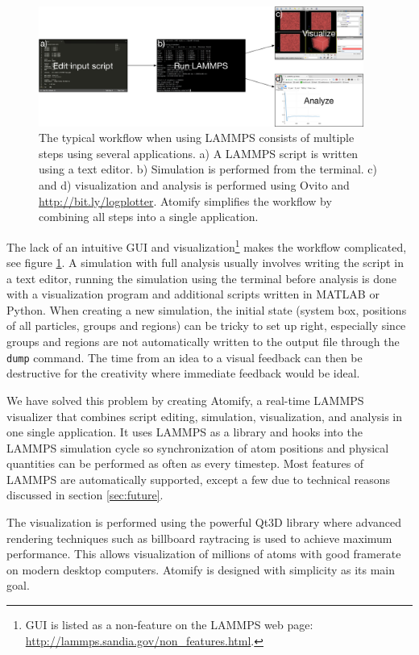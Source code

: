 \documentclass[aps,pre,twocolumn,letterpaper,floatfix,nofootinbib]{revtex4}
\newcommand{\code}[1]{\colorbox{light-gray}{\color{RawSienna}\texttt{#1}}}
\begin{document}
\begin{figure}
	\centering
	\includegraphics[width=0.95\textwidth]{flowchart.png}
	\caption{The typical workflow when using LAMMPS consists of multiple steps using several applications. a) A LAMMPS script is written using a text editor. b) Simulation is performed from the terminal. c) and d) visualization and analysis is performed using Ovito and \url{http://bit.ly/logplotter}. Atomify simplifies the workflow by combining all steps into a single application.}
	\label{fig:flowchart}
\end{figure}

The lack of an intuitive GUI and visualization\footnote{GUI is listed as a non-feature on the LAMMPS web page: \url{http://lammps.sandia.gov/non_features.html}.}
makes the workflow complicated, see figure \ref{fig:flowchart}.
A simulation with full analysis usually involves writing the script in a text editor, running the simulation using the terminal before analysis is done with a visualization program and additional scripts written in MATLAB or Python.
When creating a new simulation, the initial state (system box, positions of all particles, groups and regions) can be tricky to set up right, especially since groups and regions are not automatically written to the output file through the \code{dump} command.
The time from an idea to a visual feedback can then be destructive for the creativity where immediate feedback would be ideal.

We have solved this problem by creating Atomify, a real-time LAMMPS visualizer that combines script editing, simulation, visualization, and analysis in one single application.
It uses LAMMPS as a library and hooks into the LAMMPS simulation cycle so synchronization of atom positions and physical quantities can be performed as often as every timestep.
Most features of LAMMPS are automatically supported, except a few due to technical reasons discussed in section \ref{sec:future}.

The visualization is performed using the powerful Qt3D library where advanced rendering techniques such as billboard raytracing is used to achieve maximum performance.
This allows visualization of millions of atoms with good framerate on modern desktop computers.
Atomify is designed with simplicity as its main goal.
\end{document}

